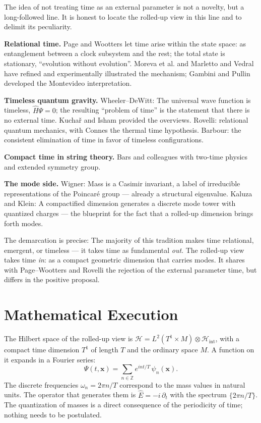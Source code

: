 The idea of not treating time as an external parameter is
not a novelty, but a long-followed line. It is honest to
locate the rolled-up view in this line and to delimit its peculiarity.

\textbf{Relational time.} Page and Wootters let time arise within
the state space: as entanglement between a clock subsystem and the rest;
the total state is stationary,
\enquote{evolution without evolution}. Moreva et al. and Marletto and
Vedral have refined and experimentally illustrated the mechanism;
Gambini and Pullin developed the Montevideo interpretation.

\textbf{Timeless quantum gravity.} Wheeler--DeWitt: The universal
wave function is timeless, $\hat H\Psi = 0$; the resulting
\enquote{problem of time} is the statement that there is no external
time. Kuchař and Isham provided the overviews. Rovelli:
relational quantum mechanics, with Connes the thermal time hypothesis.
Barbour: the consistent elimination of time in favor of timeless
configurations.

\textbf{Compact time in string theory.} Bars and colleagues with
two-time physics and extended symmetry group.

\textbf{The mode side.} Wigner: Mass is a Casimir invariant, a
label of irreducible representations of the Poincaré group --- already a
structural eigenvalue. Kaluza and Klein: A compactified
dimension generates a discrete mode tower with quantized charges
--- the blueprint for the fact that a rolled-up dimension brings forth modes.

The demarcation is precise: The majority of this tradition
makes time relational, emergent, or timeless --- it takes time
as fundamental \emph{out}. The rolled-up view takes time
\emph{in}: as a compact geometric dimension that carries modes.
It shares with Page--Wootters and Rovelli the rejection of the external
parameter time, but differs in the positive proposal.

\section{Mathematical Execution}

The Hilbert space of the rolled-up view is
$\mathcal{H} = L^2(T^1\times M)\otimes\mathcal{H}_{\mathrm{int}}$, with
a compact time dimension $T^1$ of length $T$ and the ordinary
space $M$. A function on it expands in a Fourier series:
\begin{equation}
  \Psi(t,\mathbf{x}) = \sum_{n\in\mathbb{Z}}e^{i n t/T}\,\psi_n(\mathbf{x}).
\end{equation}
The discrete frequencies $\omega_n = 2\pi n/T$ correspond to the
mass values in natural units. The operator that generates them
is $\hat E = -i\,\partial_t$ with the spectrum $\{2\pi n/T\}$. The
quantization of masses is a direct consequence of the periodicity
of time; nothing needs to be postulated.


